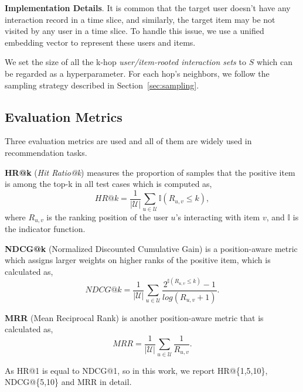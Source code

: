 \noindent\textbf{Implementation Details}.
It is common that the target user doesn't have any interaction record in a time slice, and similarly, the target item may be not visited by any user in a time slice. To handle this issue, we use a unified embedding vector to represent these users and items.

We set the size of all the k-hop \textit{user/item-rooted interaction sets} to $S$ which can be regarded as a hyperparameter.
For each hop's neighbors, we follow the sampling strategy described in Section~\ref{sec:sampling}.%


\subsection{Evaluation Metrics}
Three evaluation metrics are used and all of them are widely used in recommendation tasks.

\textbf{HR@k} (\textit{Hit Ratio@k}) measures the proportion of samples that the positive item is among the top-k in all test cases which is computed as,
\begin{equation}
HR@k = \frac{1}{|\mathcal{U}|} \sum_{u \in \mathcal{U}} \mathbb I (R_{u, v} \leq k),
\end{equation}
where $R_{u,v}$ is the ranking position of the user $u$'s interacting with item $v$, and $\mathbb I$ is the indicator function.

\textbf{NDCG@k} (Normalized Discounted Cumulative Gain) is a position-aware metric which assigns larger weights on higher ranks of the positive item, which is calculated as,
\begin{equation}
NDCG@k = \frac{1}{|\mathcal{U}|} \sum_{u \in \mathcal{U}} \frac{2^{\mathbb I (R_{u, v} \leq k)} - 1} {log(R_{u, v} + 1)}.
\end{equation}

\textbf{MRR} (Mean Reciprocal Rank) is another position-aware metric that is calculated as,
\begin{equation}
MRR = \frac{1}{|\mathcal{U}|} \sum_{u \in \mathcal{U}} \frac{1}{R_{u, v}}.
\end{equation}

As HR@1 is equal to NDCG@1, so in this work, we report HR@\{1,5,10\}, NDCG@\{5,10\} and MRR in detail.

